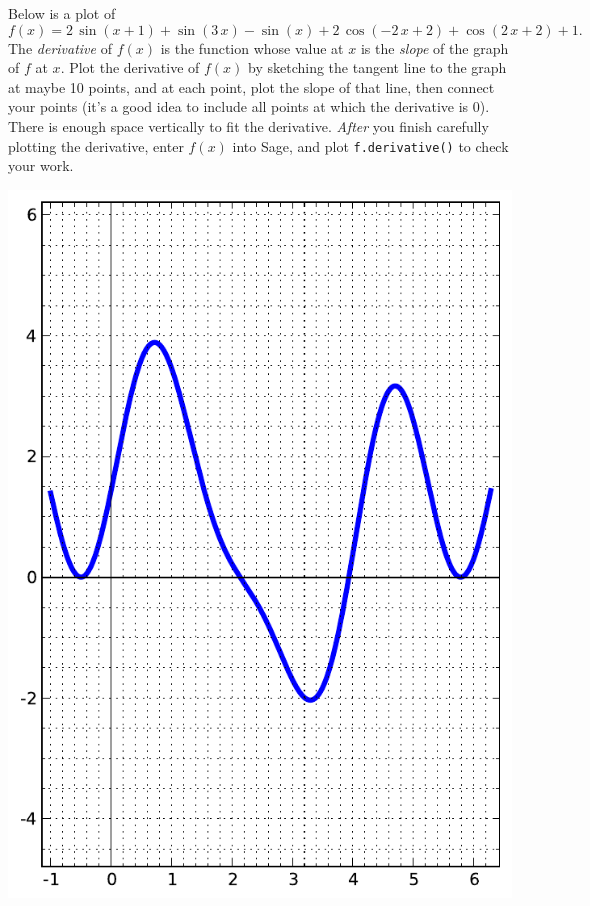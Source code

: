 Below is a plot of $$f(x)=2 \, \sin\left(x + 1\right) + \sin\left(3 \, x\right) - \sin\left(x\right) + 2 \, \cos\left(-2 \, x + 2\right) + \cos\left(2 \, x + 2\right) + 1.$$  The {\em \color{red}derivative} of $f(x)$ is the function whose value at $x$ is the {\em slope} of the graph of $f$ at $x$.  Plot the derivative of $f(x)$ by sketching the tangent line to the graph at maybe 10 points, and at each point, plot the slope of that line, then connect your points (it's a good idea to include all points at which the derivative is 0).  There is enough space vertically to fit the derivative.  {\em After} you finish carefully plotting the derivative, enter $f(x)$ into Sage, and plot {\color{blue}\verb|f.derivative()|} to check your work.
\begin{center}\includegraphics{functions/28.pdf}\end{center}\newpage

